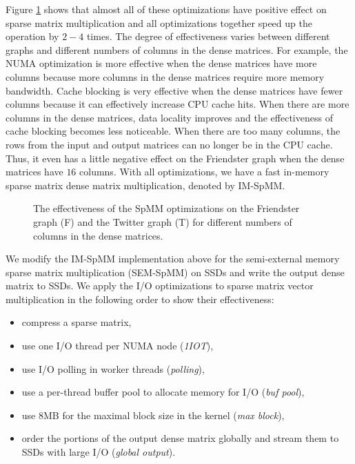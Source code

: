 Figure \ref{perf:spmm_opt} shows that almost all of these optimizations have
positive effect on sparse matrix multiplication and all optimizations
together speed up the operation by $2-4$ times. The degree of effectiveness
varies between different graphs and different numbers of columns in
the dense matrices. For example, the NUMA optimization is more effective when
the dense matrices have more columns because more columns in the dense matrices
require more memory bandwidth. Cache blocking is very effective when
the dense matrices have fewer columns because it can effectively increase CPU
cache hits. When there are more columns in the dense matrices, data locality
improves and the effectiveness of cache blocking becomes less noticeable.
When there are too many columns, the rows from
the input and output matrices can no longer be in the CPU cache. Thus, it even
has a little negative effect on the Friendster graph when the dense matrices
have $16$ columns. With all optimizations, we have a fast in-memory sparse
matrix dense matrix multiplication, denoted by IM-SpMM.

\begin{figure}
	\begin{center}
		\footnotesize
		
		\caption{The effectiveness of the SpMM optimizations on the Friendster
			graph (F) and the Twitter graph (T) for different numbers of
			columns in the dense matrices.}
		\label{perf:spmm_opt}
	\end{center}
\end{figure}

We modify the IM-SpMM implementation above for the semi-external memory sparse
matrix multiplication (SEM-SpMM) on SSDs and write the output dense matrix to
SSDs. We apply the I/O optimizations to sparse matrix vector multiplication
in the following order to show their effectiveness: 
\begin{itemize} \itemsep1pt \parskip0pt 
	\item compress a sparse matrix,
	\item use one I/O thread per NUMA node (\textit{1IOT}),
	\item use I/O polling in worker threads (\textit{polling}),
	\item use a per-thread buffer pool to allocate memory for I/O
		(\textit{buf pool}),
	\item use 8MB for the maximal block size in the kernel (\textit{max block}),
	\item order the portions of the output dense matrix globally and stream them
		to SSDs with large I/O (\textit{global output}).
\end{itemize}

